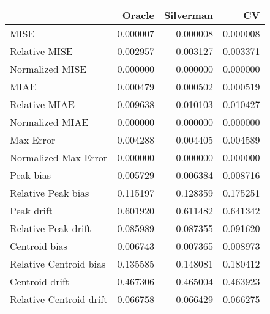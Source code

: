 \begin{tabular}{lrrr}
  \hline
 & Oracle & Silverman & CV \\ 
  \hline
MISE & 0.000007 & 0.000008 & 0.000008 \\ 
  Relative MISE & 0.002957 & 0.003127 & 0.003371 \\ 
  Normalized MISE & 0.000000 & 0.000000 & 0.000000 \\ 
  MIAE & 0.000479 & 0.000502 & 0.000519 \\ 
  Relative MIAE & 0.009638 & 0.010103 & 0.010427 \\ 
  Normalized MIAE & 0.000000 & 0.000000 & 0.000000 \\ 
  Max Error & 0.004288 & 0.004405 & 0.004589 \\ 
  Normalized Max Error & 0.000000 & 0.000000 & 0.000000 \\ 
  Peak bias & 0.005729 & 0.006384 & 0.008716 \\ 
  Relative Peak bias & 0.115197 & 0.128359 & 0.175251 \\ 
  Peak drift & 0.601920 & 0.611482 & 0.641342 \\ 
  Relative Peak drift & 0.085989 & 0.087355 & 0.091620 \\ 
  Centroid bias & 0.006743 & 0.007365 & 0.008973 \\ 
  Relative Centroid bias & 0.135585 & 0.148081 & 0.180412 \\ 
  Centroid drift & 0.467306 & 0.465004 & 0.463923 \\ 
  Relative Centroid drift & 0.066758 & 0.066429 & 0.066275 \\ 
   \hline
\end{tabular}
